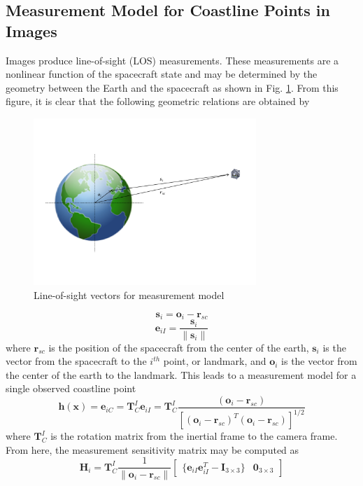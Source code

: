 \documentclass[]{aiaa-tc}%
\begin{document}

\subsection{Measurement Model for Coastline Points in Images} \label{ref:MeasModel}
Images produce line-of-sight (LOS) measurements.  These measurements are a nonlinear function of the spacecraft state and may be determined by the geometry between the Earth and the spacecraft as shown in Fig. \ref{fig:LOSgeometry}.  From this figure, it is clear that the following geometric relations are obtained by
%
\begin{figure}[ht!]
\centering
\includegraphics[width=0.75\textwidth,trim=0.8in 1.5in 0.3in 1in,clip]{LOSgeometry} %
\caption{Line-of-sight vectors for measurement model}
\label{fig:LOSgeometry}
\end{figure}
%
\begin{equation} \label{eq:s}
\textbf{s}_i=\textbf{o}_i-\textbf{r}_{sc}
\end{equation}
%
\begin{equation} \label{eq:eii}
\textbf{e}_{iI}=\frac{\textbf{s}_i}{\|\textbf{s}_i\|}
\end{equation}
%
where $\textbf{r}_{sc}$ is the position of the spacecraft from the center of the earth, $\textbf{s}_i$ is the vector from the spacecraft to the $i^{th}$ point, or landmark, and $\textbf{o}_i$ is the vector from the center of the earth to the landmark.  This leads to a measurement model for a single observed coastline point
%
\begin{equation} \label{eq:littleh}
\textbf{h}(\textbf{x})=\textbf{e}_{iC}=\textbf{T}_{C}^I\textbf{e}_{iI}=\textbf{T}_{C}^I\frac{(\textbf{o}_{i}-\textbf{r}_{sc})}{[(\textbf{o}_{i}-\textbf{r}_{sc})^T(\textbf{o}_{i}-\textbf{r}_{sc})]^{1/2}}
\end{equation}
%
where $\textbf{T}_C^I$ is the rotation matrix from the inertial frame to the camera frame.  From here, the measurement sensitivity matrix may be computed as
%
\begin{equation}
\label{eq:H}
\textbf{H}_{i}=\textbf{T}_{C}^I\frac{1}{\|\textbf{o}_i-\textbf{r}_{sc}\|}
\left[\begin{matrix}
\{\textbf{e}_{iI}\textbf{e}_{iI}^T-\textbf{I}_{3\times3}\} & \textbf{0}_{3\times3}
\end{matrix}\right]
\end{equation}
%
\end{document}

